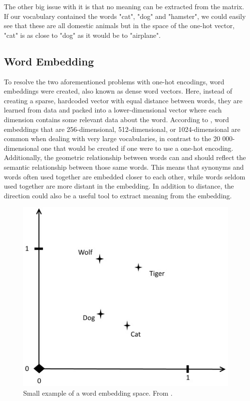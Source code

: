 \documentclass[nofilelist]{cslthse-msc}
\begin{document}
The other big issue with it is that no meaning can be extracted from the matrix. If our vocabulary contained the words "cat", "dog" and "hamster", we could easily see that these are all domestic animals but in the space of the one-hot vector, "cat" is as close to "dog" as it would be to "airplane". 

\subsection{Word Embedding}
To resolve the two aforementioned problems with one-hot encodings, word embeddings were created, also known as dense word vectors. \citep{neuralnetworkmethods} 
Here, instead of creating a sparse, hardcoded vector with equal distance between words, they are learned from data and packed into a lower-dimensional vector where each dimension contains some relevant data about the word. According to \citet{franoischollet2017learning}, word embeddings that are 256-dimensional, 512-dimensional, or 1024-dimensional are common when dealing with very large vocabularies, in contrast to the 20 000-dimensional one that would be created if one were to use a one-hot encoding. Additionally, the geometric relationship between words can and should reflect the semantic relationship between those same words. This means that synonyms and words often used together are embedded closer to each other, while words seldom used together are more distant in the embedding. In addition to distance, the direction could also be a useful tool to extract meaning from the embedding. %

\begin{figure}
\includegraphics[width=0.9\linewidth]{msccls/explanatory_images/embedding_direction.png} 
\caption{Small example of a word embedding space. From \citet{franoischollet2017learning}.}
\label{fig:direction}
\end{figure}
\end{document}

